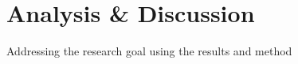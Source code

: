 \iffalse  \fi
\chapter{Analysis \& Discussion}
Addressing the research goal using the results and method
